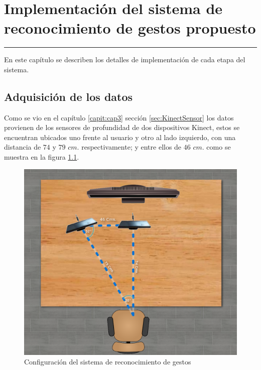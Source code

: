 \chapter{Implementación del sistema de reconocimiento de gestos propuesto}\label{capit:cap4}
\vspace{-2.0325ex}%
\noindent
\rule{\textwidth}{0.5pt}
\vspace{-5.5ex}%
\newcommand{\pushline}{\Indp}%

En este cap\'itulo se describen los detalles de implementación de cada etapa del sistema.   

\section{Adquisición de los datos}\label{sec:AdquisicionDatos}

Como se vio en el capítulo \ref{capit:cap3} sección \ref{sec:KinectSensor} los datos provienen de los sensores de profundidad de dos dispositivos Kinect, estos se encuentran ubicados uno frente al usuario y otro al lado  izquierdo, con una distancia de $74$ y $79$ $cm.$ respectivamente; y entre ellos de $46$ $cm.$ como se muestra en la figura \ref{fig:SetupSystem}.
\begin{figure}[!h]
\begin{center}
\includegraphics[scale=.2]{./Figures/system.png}
\end{center}
\caption{Configuración del sistema de reconocimiento de gestos}
\label{fig:SetupSystem}
\end{figure}  

